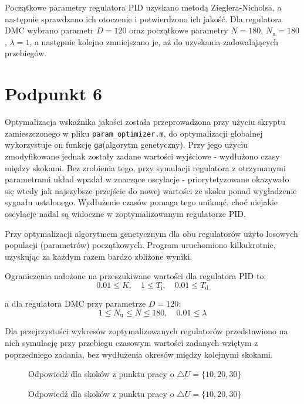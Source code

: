 Początkowe parametry regulatora PID uzyskano metodą Zieglera-Nicholsa, a następnie sprawdzano ich otoczenie i potwierdzono ich jakość. Dla regulatora DMC wybrano parametr $D=120$ oraz początkowe parametry $N=180$, $N_{\mathrm{u}}=180$, $\lambda=1$, a następnie kolejno zmniejszano je, aż do uzyskania zadowalających przebiegów.

\begin{figure}[ht]
\centering

\caption{}
\label{Z5a}
\end{figure}
\begin{figure}[ht]
\centering

\caption{}
\label{Z5b}
\end{figure}


\chapter{Podpunkt 6}
Optymalizacja wskaźnika jakości została przeprowadzona przy użyciu skryptu zamieszczonego w pliku \verb+param_optimizer.m+, do optymalizacji globalnej wykorzystuje on funkcję \verb+ga+(algorytm genetyczny). Przy jego użyciu zmodyfikowane jednak zostały zadane wartości wyjściowe - wydłużono czasy między skokami. Bez zrobienia tego, przy symulacji regulatora z otrzymanymi parametrami układ wpadał w znaczące oscylacje - priorytetyzowane okazywało się wtedy jak najszybsze przejście do nowej wartości ze skoku ponad wygładzenie sygnału ustalonego. Wydłużenie czasów pomaga tego uniknąć, choć niejakie oscylacje nadal są widoczne w zoptymalizowanym regulatorze PID.

Przy optymalizacji algorytmem genetycznym dla obu regulatorów użyto losowych populacji (parametrów) początkowych. Program uruchomiono kilkukrotnie, uzyskując za każdym razem bardzo zbliżone wyniki. 

Ograniczenia nałożone na przeszukiwane wartości dla regulatora PID to:
\begin{equation}
	0.01 \le K, \quad
	1 \le T_\mathrm{i},\quad
	0.01 \le T_\mathrm{d}
\end{equation}

a dla regulatora DMC przy parametrze $D=120$:
\begin{equation}
	1 \le N_\mathrm{u} \le N \le 180, \quad 
	0.01 \le \lambda
\end{equation}


Dla przejrzystości wykresów zoptymalizowanych regulatorów przedstawiono na nich symulację przy przebiegu czasowym wartości zadanych wziętym z poprzedniego zadania, bez wydłużenia okresów między kolejnymi skokami.

\begin{figure}[ht]
\centering

\caption{Odpowiedź dla skoków z punktu pracy o $\triangle U = \{10, 20, 30\}$}
\label{Z6a}
\end{figure}
\begin{figure}[ht]
\centering

\caption{Odpowiedź dla skoków z punktu pracy o $\triangle U = \{10, 20, 30\}$}
\label{Z6b}
\end{figure}
